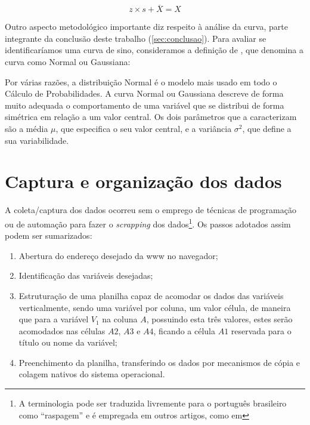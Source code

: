 	\begin{equation}
	    z \times s + \overline{X} = X
	\end{equation}
	
	Outro aspecto metodológico importante diz respeito à análise da curva, parte integrante da conclusão deste trabalho (\autoref{sec:conclusao}). Para avaliar se identificaríamos uma curva de sino, consideramos a definição de , que denomina a curva como Normal ou Gaussiana:
	
	\begin{citacao}
		Por várias razões, a distribuição Normal é o modelo mais usado em todo o Cálculo de Probabilidades. A curva Normal ou Gaussiana descreve de forma muito adequada o comportamento de uma variável que se distribui de forma simétrica em relação a um valor central. Os dois parâmetros que a caracterizam são a média $\mu$, que especifica o seu valor central, e a variância $\sigma^2$, que define a sua variabilidade.
	\end{citacao}
	
	\section{Captura e organização dos dados}

	A coleta/captura dos dados ocorreu sem o emprego de técnicas de programação ou de automação para fazer o \textit{scrapping} dos dados\footnote{A terminologia pode ser traduzida livremente para o português brasileiro como ``raspagem'' e é empregada em outros artigos, como em }. Os passos adotados assim podem ser sumarizados:
	
	\begin{enumerate}
	    \item Abertura do endereço desejado da \gls{www} no navegador;
	    \item Identificação das variáveis desejadas;
	    \item Estruturação de uma planilha capaz de acomodar os dados das variáveis verticalmente, sendo uma variável por coluna, um valor célula, de maneira que para a variável $V_1$ na coluna $A$, possuindo esta três valores, estes serão acomodados nas células $A2$, $A3$ e $A4$, ficando a célula $A1$ reservada para o título ou nome da variável;
	    \item Preenchimento da planilha, transferindo os dados por mecanismos de cópia e colagem nativos do sistema operacional.
	\end{enumerate}

